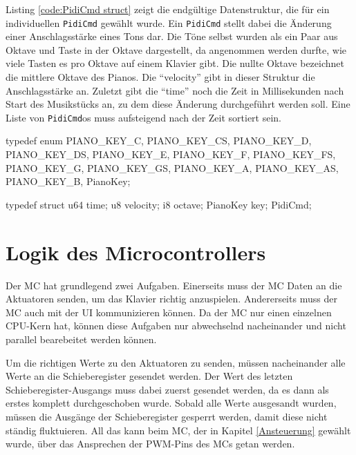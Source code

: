 Listing \ref{code:PidiCmd struct} zeigt die endgültige Datenstruktur, die für ein individuellen \lstinline{PidiCmd} gewählt wurde.
Ein \lstinline{PidiCmd} stellt dabei die Änderung einer Anschlagsstärke eines Tons dar.
Die Töne selbst wurden als ein Paar aus Oktave und Taste in der Oktave dargestellt, da angenommen werden durfte, wie viele Tasten es pro Oktave auf einem Klavier gibt.
Die nullte Oktave bezeichnet die mittlere Oktave des Pianos.
Die \enquote{velocity} gibt in dieser Struktur die Anschlagsstärke an.
Zuletzt gibt die \enquote{time} noch die Zeit in Millisekunden nach Start des Musikstücks an, zu dem diese Änderung durchgeführt werden soll.
Eine Liste von \lstinline{PidiCmd}os muss aufsteigend nach der Zeit sortiert sein.

\begin{UnbrokenCodePage}[style=CStyle, caption={Definition eines \ac{PIDI}-Kommands}, label={code:PidiCmd struct}]
typedef enum {
    PIANO_KEY_C,
    PIANO_KEY_CS,
    PIANO_KEY_D,
    PIANO_KEY_DS,
    PIANO_KEY_E,
    PIANO_KEY_F,
    PIANO_KEY_FS,
    PIANO_KEY_G,
    PIANO_KEY_GS,
    PIANO_KEY_A,
    PIANO_KEY_AS,
    PIANO_KEY_B,
} PianoKey;

typedef struct {
    u64  time;
    u8   velocity;
    i8   octave;
    PianoKey key;
} PidiCmd;
\end{UnbrokenCodePage}

\section{Logik des Microcontrollers} \label{vorgehenSW-MC}

Der \ac{MC} hat grundlegend zwei Aufgaben.
Einerseits muss der \ac{MC} Daten an die Aktuatoren senden, um das Klavier richtig anzuspielen.
Andererseits muss der \ac{MC} auch mit der \ac{UI} kommunizieren können.
Da der \ac{MC} nur einen einzelnen CPU-Kern hat, können diese Aufgaben nur abwechselnd nacheinander und nicht parallel bearebeitet werden können.

Um die richtigen Werte zu den Aktuatoren zu senden, müssen nacheinander alle Werte an die Schieberegister gesendet werden.
Der Wert des letzten Schieberegister-Ausgangs muss dabei zuerst gesendet werden, da es dann als erstes komplett durchgeschoben wurde.
Sobald alle Werte ausgesandt wurden, müssen die Ausgänge der Schieberegister gesperrt werden, damit diese nicht ständig fluktuieren.
All das kann beim \ac{MC}, der in Kapitel \ref{Ansteuerung} gewählt wurde, über das Ansprechen der \ac{PWM}-Pins des \ac{MC}s getan werden.


